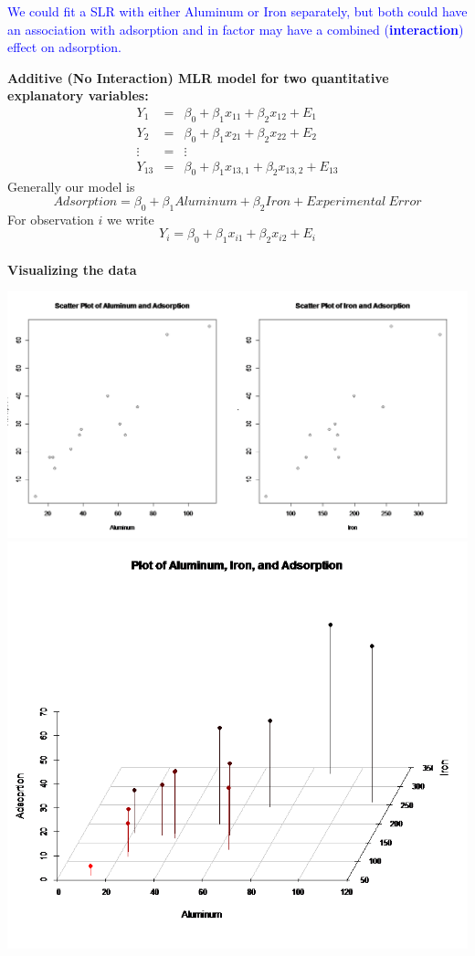 \textcolor{blue}{We could fit a SLR with either Aluminum or Iron separately, but both could have an association with adsorption and in factor may have a combined (\textbf{interaction}) effect on adsorption.}

\newpage

\Large\textbf{Additive (No Interaction) MLR model for two quantitative explanatory variables:}\large\\
\begin{eqnarray*}
Y_{1} &=& \beta_0 + \beta_1 x_{11} + \beta_2 x_{12} + E_{1}  \\
Y_{2} &=& \beta_0 + \beta_1 x_{21} + \beta_2 x_{22} + E_{2}  \\
\vdots & = & \vdots \\
Y_{13} &=& \beta_0 + \beta_1 x_{13,1} + \beta_2 x_{13,2} + E_{13}  
\end{eqnarray*}
Generally our model is 
$$Adsorption = \beta_0+\beta_1Aluminum+\beta_2Iron+Experimental~Error$$
For observation $i$ we write 
$$Y_i = \beta_0 + \beta_1 x_{i1} + \beta_2 x_{i2} + E_{i}$$~\\

\textbf{Visualizing the data}
\begin{flushright}
\includegraphics[scale=0.3]{scattermlr}\\
\includegraphics[scale=0.4]{scatter3dmlr}
\end{flushright}

